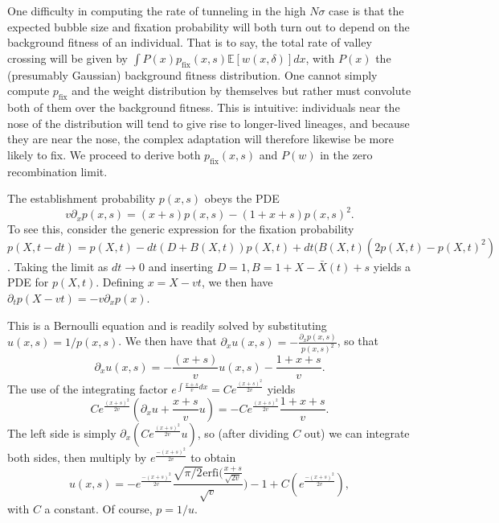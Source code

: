 \documentclass[rmp]{revtex4}
\begin{document}
One difficulty in computing the rate of tunneling in the high $N\sigma$ case is that the expected bubble size and fixation probability will both turn out to depend on the background fitness of an individual.
That is to say, the total rate of valley crossing will be given by $\int P(x) p_{\mathrm{fix}}(x,s) \mathbb{E}\left[ w(x,\delta) \right] dx$, with $P(x)$ the (presumably Gaussian) background fitness distribution.
One cannot simply compute $p_{\mathrm{fix}}$ and the weight distribution by themselves but rather must convolute both of them over the background fitness.
This is intuitive: individuals near the nose of the distribution will tend to give rise to longer-lived lineages, and because they are near the nose, the complex adaptation will therefore likewise be more likely to fix.
We proceed to derive both $p_{\mathrm{fix}}(x,s)$ and $P(w)$ in the zero recombination limit.

The establishment probability $p(x,s)$ obeys the PDE
\begin{equation}
v \partial_x p(x,s) = (x+s)p(x,s) - (1+x+s)p(x,s)^2.
\end{equation}
To see this, consider the generic expression for the fixation probability
\begin{equation}
p(X,t-dt) = p(X,t)-dt(D+B(X,t))p(X,t) + dt(B(X,t)(2p(X,t)-p(X,t)^2)
\end{equation}
\citep{barton_1995}. Taking the limit as $dt \to 0$ and inserting $D = 1, B = 1 + X -\bar{X}(t)+s$ yields a PDE for $p(X,t)$.
Defining $x = X - vt$, we then have $\partial_t p(X-vt) = -v\partial_x p(x)$.

This is a Bernoulli equation and is readily solved by substituting $u(x,s) = 1/p(x,s)$. We then have that $\partial_x u(x,s) = -\frac{\partial_x p(x,s)}{p(x,s)^2}$, so that
\begin{equation}
\partial_x u(x,s) = -\frac{(x+s)}{v}u(x,s) - \frac{1+x+s}{v}.
\end{equation}
The use of the integrating factor $e^{\int \frac{x+s}{v} dx} = Ce^{\frac{(x+s)^2}{2v}}$ yields
\begin{equation}
Ce^{\frac{(x+s)^2}{2v}} (\partial_x u + \frac{x+s}{v}u) = -Ce^{\frac{(x+s)^2}{2v}}\frac{1+x+s}{v}.
\end{equation}
The left side is simply $\partial_x(Ce^{\frac{(x+s)^2}{2v}}u)$, so (after dividing $C$ out) we can integrate both sides, then multiply by $e^{\frac{-(x+s)^2}{2v}}$ to obtain
\begin{equation}
u(x,s) =  -e^{\frac{-(x+s)^2}{2v}} \frac{\sqrt{\pi /2} \textrm{erfi}(\frac{x+s}{\sqrt{2v}}}{\sqrt{v}}) - 1 + C(e^{\frac{-(x+s)^2}{2v}}),
\end{equation}
with $C$ a constant. Of course, $p = 1/u$.
\end{document}
